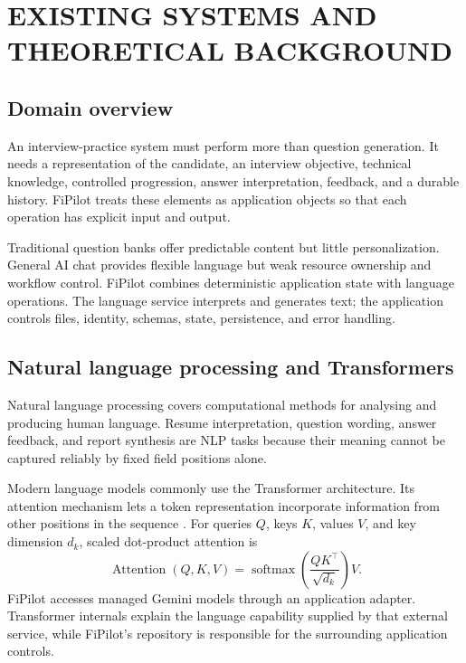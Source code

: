 \chapter{EXISTING SYSTEMS AND THEORETICAL BACKGROUND}\label{ch:background}

\section{Domain overview}

An interview-practice system must perform more than question generation. It needs a representation of the candidate, an interview objective, technical knowledge, controlled progression, answer interpretation, feedback, and a durable history. FiPilot treats these elements as application objects so that each operation has explicit input and output.

Traditional question banks offer predictable content but little personalization. General AI chat provides flexible language but weak resource ownership and workflow control. FiPilot combines deterministic application state with language operations. The language service interprets and generates text; the application controls files, identity, schemas, state, persistence, and error handling.

\section{Natural language processing and Transformers}

Natural language processing covers computational methods for analysing and producing human language. Resume interpretation, question wording, answer feedback, and report synthesis are NLP tasks because their meaning cannot be captured reliably by fixed field positions alone.

Modern language models commonly use the Transformer architecture. Its attention mechanism lets a token representation incorporate information from other positions in the sequence \cite{vaswani2017attention}. For queries $Q$, keys $K$, values $V$, and key dimension $d_k$, scaled dot-product attention is
\begin{equation}
\operatorname{Attention}(Q,K,V)=\operatorname{softmax}\left(\frac{QK^{\top}}{\sqrt{d_k}}\right)V.
\end{equation}
FiPilot accesses managed Gemini models through an application adapter. Transformer internals explain the language capability supplied by that external service, while FiPilot's repository is responsible for the surrounding application controls.


